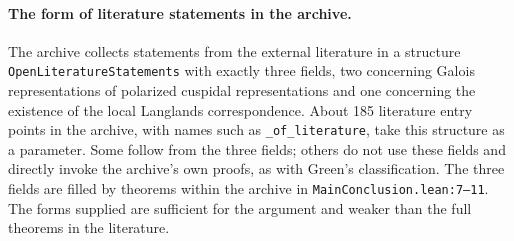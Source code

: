 \documentclass[11pt]{article}
\newcommand{\Lean}[1]{\texttt{\small #1}}
\begin{document}
\paragraph{The form of literature statements in the archive.} The archive collects statements from the external literature in a structure \Lean{OpenLiteratureStatements} with exactly three fields, two concerning Galois representations of polarized cuspidal representations and one concerning the existence of the local Langlands correspondence. About 185 literature entry points in the archive, with names such as \Lean{\_of\_literature}, take this structure as a parameter. Some follow from the three fields; others do not use these fields and directly invoke the archive's own proofs, as with Green's classification. The three fields are filled by theorems within the archive in \Lean{MainConclusion.lean:7--11}. The forms supplied are sufficient for the argument and weaker than the full theorems in the literature.
\end{document}
